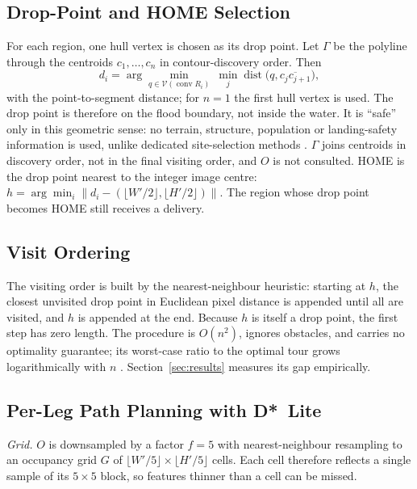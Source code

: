 \subsection{Drop-Point and HOME Selection}
For each region, one hull vertex is chosen as its drop point. Let $\Gamma$ be the polyline through the centroids $c_1,\dots,c_n$ in contour-discovery order. Then
\begin{equation}
d_i=\arg\min_{q\in\mathcal{V}(\operatorname{conv}R_i)}\ \min_{j}\operatorname{dist}\big(q,\overline{c_jc_{j+1}}\big),
\label{eq:drop}
\end{equation}
with the point-to-segment distance; for $n=1$ the first hull vertex is used. The drop point is therefore on the flood boundary, not inside the water. It is ``safe'' only in this geometric sense: no terrain, structure, population or landing-safety information is used, unlike dedicated site-selection methods \cite{patterson2014timely,kaljahi2019automatic}. $\Gamma$ joins centroids in discovery order, not in the final visiting order, and $O$ is not consulted. HOME is the drop point nearest to the integer image centre: $h=\arg\min_i\lVert d_i-(\lfloor W'/2\rfloor,\lfloor H'/2\rfloor)\rVert$. The region whose drop point becomes HOME still receives a delivery.

\subsection{Visit Ordering}
The visiting order is built by the nearest-neighbour heuristic: starting at $h$, the closest unvisited drop point in Euclidean pixel distance is appended until all are visited, and $h$ is appended at the end. Because $h$ is itself a drop point, the first step has zero length. The procedure is $O(n^2)$, ignores obstacles, and carries no optimality guarantee; its worst-case ratio to the optimal tour grows logarithmically with $n$ \cite{rosenkrantz1977analysis}. Section~\ref{sec:results} measures its gap empirically.

\subsection{Per-Leg Path Planning with D*~Lite}
\label{sec:dstar}
\emph{Grid.} $O$ is downsampled by a factor $f=5$ with nearest-neighbour resampling to an occupancy grid $G$ of $\lfloor W'/5\rfloor\times\lfloor H'/5\rfloor$ cells. Each cell therefore reflects a single sample of its $5\times5$ block, so features thinner than a cell can be missed.


